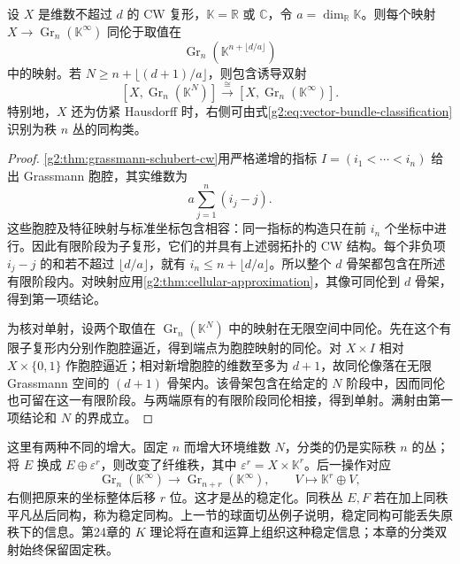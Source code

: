 \begin{proposition}\label{g2:prop:finite-grassmann-approximation}
	设 \(X\) 是维数不超过 \(d\) 的 CW 复形，\(\mathbb K=\mathbb R\) 或 \(\mathbb C\)，令 \(a=\dim_{\mathbb R}\mathbb K\)。则每个映射 \(X\to\operatorname{Gr}_n(\mathbb K^\infty)\) 同伦于取值在
	\[
		\operatorname{Gr}_n(\mathbb K^{n+\lfloor d/a\rfloor})
	\]
	中的映射。若 \(N\ge n+\lfloor(d+1)/a\rfloor\)，则包含诱导双射
	\[
		[X,\operatorname{Gr}_n(\mathbb K^N)]
		\xrightarrow{\ \cong\ }
		[X,\operatorname{Gr}_n(\mathbb K^\infty)].
	\]
	特别地，\(X\) 还为仿紧 Hausdorff 时，右侧可由式\eqref{g2:eq:vector-bundle-classification}识别为秩 \(n\) 丛的同构类。
\end{proposition}
\begin{proof}
	\cref{g2:thm:grassmann-schubert-cw}用严格递增的指标 \(I=(i_1<\cdots<i_n)\) 给出 Grassmann 胞腔，其实维数为
	\[
		a\sum_{j=1}^n(i_j-j).
	\]
	这些胞腔及特征映射与标准坐标包含相容：同一指标的构造只在前 \(i_n\) 个坐标中进行。因此有限阶段为子复形，它们的并具有上述弱拓扑的 CW 结构。每个非负项 \(i_j-j\) 的和若不超过 \(\lfloor d/a\rfloor\)，就有 \(i_n\le n+\lfloor d/a\rfloor\)。所以整个 \(d\) 骨架都包含在所述有限阶段内。对映射应用\cref{g2:thm:cellular-approximation}，其像可同伦到 \(d\) 骨架，得到第一项结论。

	为核对单射，设两个取值在 \(\operatorname{Gr}_n(\mathbb K^N)\) 中的映射在无限空间中同伦。先在这个有限子复形内分别作胞腔逼近，得到端点为胞腔映射的同伦。对 \(X\times I\) 相对 \(X\times\{0,1\}\) 作胞腔逼近；相对新增胞腔的维数至多为 \(d+1\)，故同伦像落在无限 Grassmann 空间的 \((d+1)\) 骨架内。该骨架包含在给定的 \(N\) 阶段中，因而同伦也可留在这一有限阶段。与两端原有的有限阶段同伦相接，得到单射。满射由第一项结论和 \(N\) 的界成立。
\end{proof}

这里有两种不同的增大。固定 \(n\) 而增大环境维数 \(N\)，分类的仍是实际秩 \(n\) 的丛；将 \(E\) 换成 \(E\oplus\varepsilon^r\)，则改变了纤维秩，其中 \(\varepsilon^r=X\times\mathbb K^r\)。后一操作对应
\[
	\operatorname{Gr}_n(\mathbb K^\infty)\longrightarrow
	\operatorname{Gr}_{n+r}(\mathbb K^\infty),\qquad
	V\longmapsto\mathbb K^r\oplus V,
\]
右侧把原来的坐标整体后移 \(r\) 位。这才是丛的稳定化。同秩丛 \(E,F\) 若在加上同秩平凡丛后同构，称为稳定同构。上一节的球面切丛例子说明，稳定同构可能丢失原秩下的信息。第24章的 \(K\) 理论将在直和运算上组织这种稳定信息；本章的分类双射始终保留固定秩。
